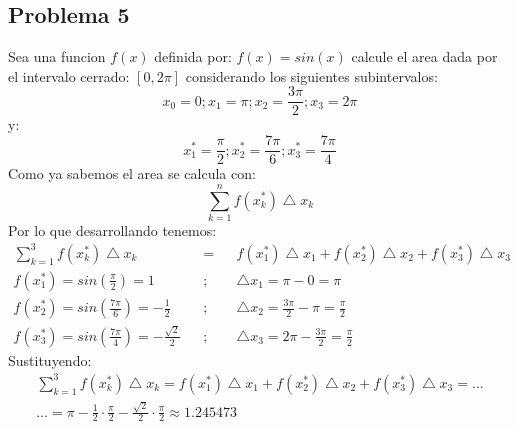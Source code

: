 \documentclass{article}
\begin{document}
\subsection{Problema 5}
Sea una funcion \(f(x)\) definida por: \(f(x) = sin(x)\) calcule el area dada por el intervalo cerrado: \([0,2\pi]\) considerando los siguientes subintervalos: $$x_0 = 0; x_1 = \pi; x_2 = \frac{3\pi}{2}; x_3 = 2\pi$$ y: $$x_1^*=\frac{\pi}{2}; x_2^*=\frac{7\pi}{6}; x_3^* = \frac{7\pi}{4}$$
Como ya sabemos el area se calcula con: $$\sum_{k=1}^{n}f(x^*_k) \bigtriangleup  x_k$$
Por lo que desarrollando tenemos:
\begin{align*}
  \sum_{k=1}^{3}f(x^*_k) \bigtriangleup  x_k                      &  & = &  & f(x_1^*)\bigtriangleup x_1 + f(x_2^*)\bigtriangleup x_2 + f(x_3^*)\bigtriangleup x_3 \\
  f(x_1^*) = sin\left(\frac{\pi}{2}\right) = 1                    &  & ; &  & \bigtriangleup x_1 = \pi - 0 = \pi                                                   \\
  f(x_2^*) = sin\left(\frac{7\pi}{6}\right) = -\frac{1}{2}        &  & ; &  & \bigtriangleup x_2 = \frac{3\pi}{2} - \pi = \frac{\pi}{2}                            \\
  f(x_3^*) = sin\left(\frac{7\pi}{4}\right) = -\frac{\sqrt{2}}{2} &  & ; &  & \bigtriangleup x_3 = 2\pi - \frac{3\pi}{2}  = \frac{\pi}{2}
\end{align*}
Sustituyendo:
\begin{align*}
  \sum_{k=1}^{3}f(x^*_k) \bigtriangleup  x_k = f(x_1^*)\bigtriangleup x_1 + f(x_2^*)\bigtriangleup x_2 + f(x_3^*)\bigtriangleup x_3 = \dots \\ \dots = \pi - \frac{1}{2} \cdot \frac{\pi}{2} - \frac{\sqrt{2}}{2} \cdot \frac{\pi}{2} \approx 1.245473
\end{align*}
\end{document}
